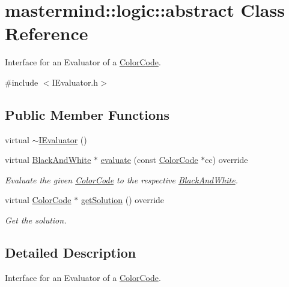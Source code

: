 \hypertarget{classmastermind_1_1logic_1_1abstract}{}\section{mastermind\+:\+:logic\+:\+:abstract Class Reference}
\label{classmastermind_1_1logic_1_1abstract}


Interface for an Evaluator of a \hyperlink{classmastermind_1_1logic_1_1_color_code}{Color\+Code}.  




{\ttfamily \#include $<$I\+Evaluator.\+h$>$}

\subsection*{Public Member Functions}
\begin{DoxyCompactItemize}
\item 
virtual \hyperlink{classmastermind_1_1logic_1_1abstract_a901e84f7a39b9b80224a94ec90b14c25}{$\sim$\+I\+Evaluator} ()
\item 
virtual \hyperlink{classmastermind_1_1logic_1_1_black_and_white}{Black\+And\+White} $\ast$ \hyperlink{classmastermind_1_1logic_1_1abstract_ae495ab3e498c26cc17a0c7b59fe16871}{evaluate} (const \hyperlink{classmastermind_1_1logic_1_1_color_code}{Color\+Code} $\ast$cc) override
\begin{DoxyCompactList}\small\item\em Evaluate the given \hyperlink{classmastermind_1_1logic_1_1_color_code}{Color\+Code} to the respective \hyperlink{classmastermind_1_1logic_1_1_black_and_white}{Black\+And\+White}. \end{DoxyCompactList}\item 
virtual \hyperlink{classmastermind_1_1logic_1_1_color_code}{Color\+Code} $\ast$ \hyperlink{classmastermind_1_1logic_1_1abstract_a3d7e6bdbf8f3926fd42907d86291a373}{get\+Solution} () override
\begin{DoxyCompactList}\small\item\em Get the solution. \end{DoxyCompactList}\end{DoxyCompactItemize}


\subsection{Detailed Description}
Interface for an Evaluator of a \hyperlink{classmastermind_1_1logic_1_1_color_code}{Color\+Code}. 


